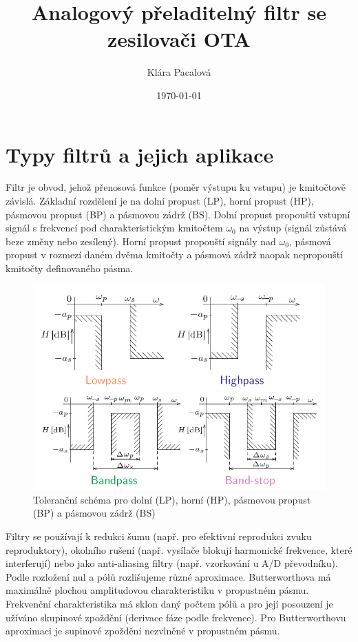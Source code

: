 \documentclass[twoside]{article}
\title{Analogový přeladitelný filtr se zesilovači OTA}
\author{Klára Pacalová}
\date{\today}
\begin{document}
\maketitle

\section{Typy filtrů a jejich aplikace}
Filtr je obvod, jehož přenosová funkce (poměr výstupu ku vstupu) je kmitočtově závislá. Základní rozdělení je na dolní propust (LP), horní propust (HP), pásmovou propust (BP) a pásmovou zádrž (BS). Dolní propust propouští vstupní signál s frekvencí pod charakteristickým kmitočtem $\omega _0$ na výstup (signál zůstává beze změny nebo zesílený). Horní propust propouští signály nad $\omega _0$, pásmová propust v rozmezí daném dvěma kmitočty a pásmová zádrž naopak nepropouští kmitočty definovaného pásma.
\begin{figure}[H]
\centering
\includegraphics[scale=0.6]{image9.png}
\caption{Toleranční schéma pro dolní (LP), horní (HP), pásmovou propust (BP) a pásmovou zádrž (BS)\cite{1}}
\end{figure}
\noindent Filtry se používají k redukci šumu (např. pro efektivní reprodukci zvuku reproduktory), okolního rušení (např. vysílače blokují harmonické frekvence, které interferují) nebo jako anti-aliasing filtry (např. vzorkování u A/D převodníku).\\
Podle rozložení nul a pólů rozlišujeme různé aproximace. Butterworthova má maximálně plochou amplitudovou charakteristiku v propustném pásmu. Frekvenční charakteristika má sklon daný počtem pólů a pro její posouzení je užíváno skupinové zpoždění (derivace fáze podle frekvence). Pro Butterworthovu aproximaci je supinové zpoždění nezvlněné v propustném pásmu. \\
\end{document}
